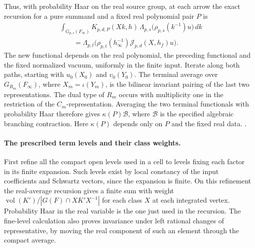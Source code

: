 Thus, with probability Haar on the real source group, at
each arrow the exact recursion for a pure summand and a
fixed real polynomial pair \(P\) is
\[
 \begin{split}
 &\int_{G_{p,s}(F_\infty)}
    K_{p,d,P}(Xk,h)\,
             \Lambda_{p,s}\big(\rho_{p,s}(k^{-1})u\big)\,dk\\
 &\hspace{2em}=
 \Lambda_{p,t}\big(\rho_{p,t}(h_\infty^{-1})
                  \mathcal J_{p,d}(X,h_f)u\big).
 \end{split}
\]
The new functional depends on the real polynomial, the preceding
functional and the fixed normalized vacuum, uniformly in the
finite input. Iterate along both paths, starting with
\(u_0(X_0)\) and \(v_0(Y_0)\). The terminal average over
\(G_{R_m}(F_\infty)\), where \(X_m=\iota(Y_m)\), is the
bilinear invariant pairing of the last two representations.
The dual type of \(R_m\) occurs with multiplicity one in the
restriction of the \(C_m\)-representation. Averaging the two
terminal functionals with probability Haar therefore gives
\(\kappa(P)\mathcal B\), where \(\mathcal B\) is the specified
algebraic branching contraction. Here \(\kappa(P)\) depends
only on \(P\) and the fixed real data.
.

\paragraph{The prescribed term levels and their class weights.}
First refine all the compact open levels used in a cell to
levels fixing each factor in its finite expansion. Such levels
exist by local constancy of the input coefficients and
Schwartz vectors, since the expansion is finite. On this
refinement the real-average recursion gives a finite sum
with weight \(\operatorname{vol}(K')/
|G(F)\cap X K' X^{-1}|\) for each class \(X\) at each
integrated vertex. Probability Haar in the real variable is
the one just used in the recursion. The fine-level calculation
also proves invariance under left rational changes of
representative, by moving the real component of such an
element through the compact average.

